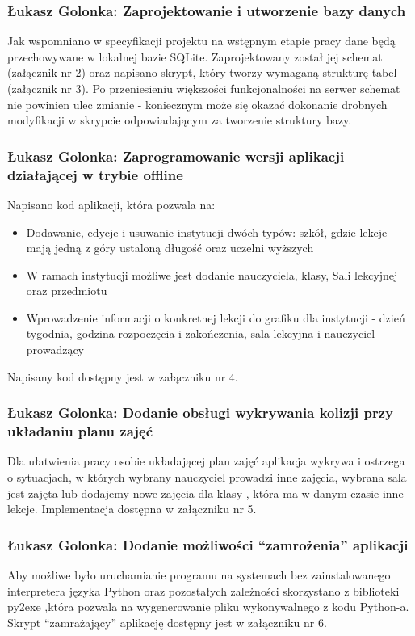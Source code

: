 \documentclass[12pt,a4paper,oneside]{article}
\theoremstyle{definition}
\numberwithin{equation}{section}
\begin{document}
\subsubsection{Łukasz Golonka: Zaprojektowanie i utworzenie bazy danych}
Jak wspomniano w specyfikacji projektu na wstępnym etapie pracy dane będą przechowywane w lokalnej bazie SQLite. Zaprojektowany został jej schemat (załącznik nr 2) oraz napisano skrypt, który tworzy wymaganą strukturę tabel (załącznik nr 3). Po przeniesieniu większości funkcjonalności na serwer  schemat nie powinien ulec zmianie - koniecznym może się okazać dokonanie drobnych modyfikacji w skrypcie odpowiadającym za tworzenie struktury bazy.

\subsubsection{Łukasz Golonka: Zaprogramowanie wersji aplikacji działającej w trybie offline}
Napisano kod aplikacji, która pozwala na:
\begin{itemize}
	\item Dodawanie, edycje i usuwanie instytucji dwóch typów: szkół, gdzie lekcje  mają jedną z góry ustaloną długość oraz uczelni wyższych
	\item W ramach instytucji możliwe jest dodanie nauczyciela, klasy, Sali lekcyjnej oraz przedmiotu
	\item Wprowadzenie informacji o konkretnej lekcji do grafiku dla instytucji - dzień tygodnia, godzina rozpoczęcia i zakończenia, sala lekcyjna i nauczyciel prowadzący
\end{itemize}
Napisany kod dostępny jest w załączniku nr 4.
\subsubsection{Łukasz Golonka: Dodanie obsługi wykrywania kolizji przy układaniu planu zajęć}
Dla ułatwienia pracy osobie układającej plan zajęć aplikacja wykrywa i ostrzega o sytuacjach, w których wybrany nauczyciel prowadzi inne zajęcia, wybrana sala jest zajęta lub dodajemy nowe zajęcia dla klasy , która ma w danym czasie inne lekcje. Implementacja dostępna w załączniku nr 5.


\subsubsection{Łukasz Golonka: Dodanie możliwości ``zamrożenia'' aplikacji}
Aby możliwe było uruchamianie programu na systemach bez zainstalowanego interpretera języka Python oraz pozostałych zależności skorzystano z biblioteki py2exe ,która pozwala na wygenerowanie pliku wykonywalnego z kodu Python-a. Skrypt ``zamrażający'' aplikację dostępny jest w załączniku nr 6.
\end{document}
